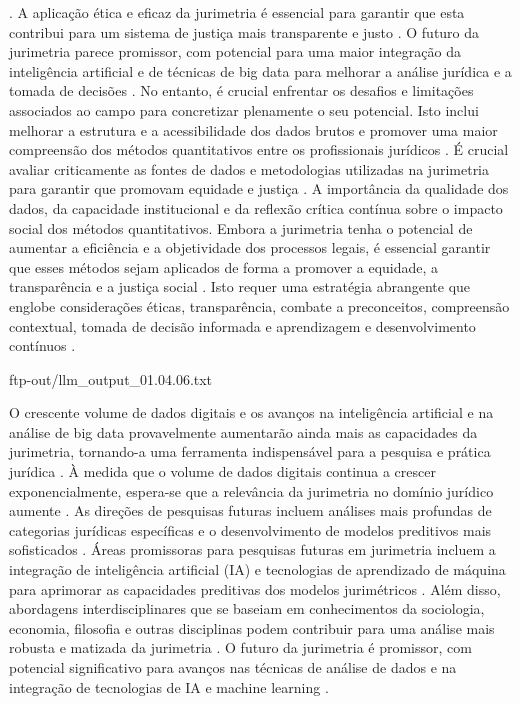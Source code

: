 \begin{agradecimentos}
\cite{10.1007/s11186-021-09453-1,10.1057/s41599-020-0396-5}. A aplicação ética e eficaz da jurimetria é essencial para garantir que esta contribui para um sistema de justiça mais transparente e justo \cite{silva2023role, zabala2019d}. O futuro da jurimetria parece promissor, com potencial para uma maior integração da inteligência artificial e de técnicas de big data para melhorar a análise jurídica e a tomada de decisões \cite{silva2023role}. No entanto, é crucial enfrentar os desafios e limitações associados ao campo para concretizar plenamente o seu potencial. Isto inclui melhorar a estrutura e a acessibilidade dos dados brutos e promover uma maior compreensão dos métodos quantitativos entre os profissionais jurídicos \cite{l2010de}. É crucial avaliar criticamente as fontes de dados e metodologias utilizadas na jurimetria para garantir que promovam equidade e justiça \cite{10.1590/dados.2022.65.3.267,10.1057/s41599-020-0396-5}. A importância da qualidade dos dados, da capacidade institucional e da reflexão crítica contínua sobre o impacto social dos métodos quantitativos. Embora a jurimetria tenha o potencial de aumentar a eficiência e a objetividade dos processos legais, é essencial garantir que esses métodos sejam aplicados de forma a promover a equidade, a transparência e a justiça social \cite{10.1590/dados.2022.65.3.267,1023071190721}. Isto requer uma estratégia abrangente que englobe considerações éticas, transparência, combate a preconceitos, compreensão contextual, tomada de decisão informada e aprendizagem e desenvolvimento contínuos \cite{10.1590/dados.2022.65.3.267,1023071190721}. 
    
    ftp-out/llm_output_01.04.06.txt 
    
    O crescente volume de dados digitais e os avanços na inteligência artificial e na análise de big data provavelmente aumentarão ainda mais as capacidades da jurimetria, tornando-a uma ferramenta indispensável para a pesquisa e prática jurídica \cite{silva2023papel}. À medida que o volume de dados digitais continua a crescer exponencialmente, espera-se que a relevância da jurimetria no domínio jurídico aumente \cite{silva2023role}. As direções de pesquisas futuras incluem análises mais profundas de categorias jurídicas específicas e o desenvolvimento de modelos preditivos mais sofisticados \cite{silva2023role}. Áreas promissoras para pesquisas futuras em jurimetria incluem a integração de inteligência artificial (IA) e tecnologias de aprendizado de máquina para aprimorar as capacidades preditivas dos modelos jurimétricos \cite{silva2023role,nunes2016jurimetria}. Além disso, abordagens interdisciplinares que se baseiam em conhecimentos da sociologia, economia, filosofia e outras disciplinas podem contribuir para uma análise mais robusta e matizada da jurimetria \cite{silva2023role,nunes2016jurimetria}. O futuro da jurimetria é promissor, com potencial significativo para avanços nas técnicas de análise de dados e na integração de tecnologias de IA e machine learning \cite{silva2023role,nunes2016jurimetria}. 
    

\end{agradecimentos}
